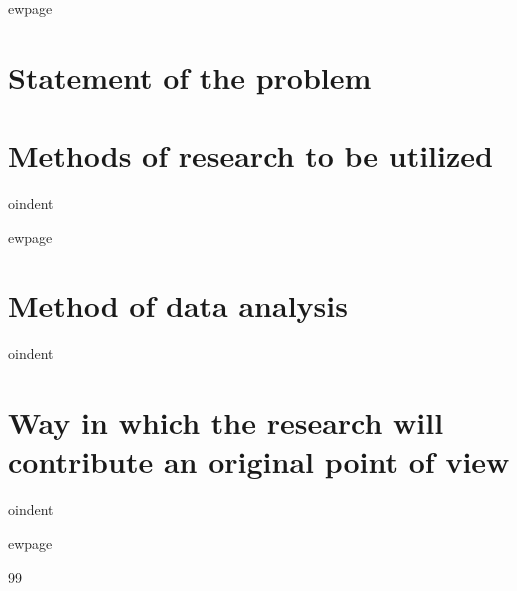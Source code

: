 \documentclass{article}
\begin{document}
ewpage
\section{Statement of the problem}
\begin{flushleft}
\doublespacing

\end{flushleft}

\section{Methods of research to be utilized}

oindent
\doublespacing
\begin{flushleft}

\end{flushleft}


ewpage
\section{Method of data analysis}

oindent
\doublespacing
\begin{flushleft}

\end{flushleft}

\section{Way in which the research will contribute an original point of view}

oindent
\doublespacing
\begin{flushleft}

\end{flushleft}

ewpage

\begin{thebibliography}{99}
\end{thebibliography}
\end{document}
